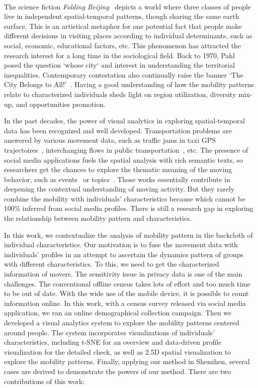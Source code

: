 \label{intro}
\\
The science fiction \textit{Folding Beijing}~\citep{hao2016_foldingbeijing} depicts a world where three classes of people live in independent spatial-temporal patterns, though sharing the same earth surface. This is an artistical metaphor for one potential fact that people make different decisions in visiting places according to individual determinants, such as social, economic, educational factors, etc. This phenomenon has attracted the research interest for a long time in the sociological field. Back to 1970, Pahl~\citep{pahl1975whose} posed the question `whose city` and interest in understanding the territorial inequalities. Contemporary contestation also continually raise the banner `The City Belongs to All!'~\citep{Mayer2017_whosecity}. Having a good understanding of how the mobility patterns relate to characterized individuals sheds light on region utilization, diversity mix-up, and opportunities promotion.

In the past decades, the power of visual analytics in exploring spatial-temporal data has been recognized and well developed. Transportation problems are answered by various movement data, such as traffic jams in taxi GPS trajectoires~\citep{wang2013visual}, interchanging flows in public transportation~\citep{zeng2013visualizing}, etc. The presence of social media applications fuels the spatial analysis with rich semantic texts, so researchers get the chances to explore the thematic meaning of the moving behavior, such as events~\citep{chen2017map} or topics~\citep{bosch2013scatterblogs2}. Those works essentially contribute in deepening the contextual understanding of moving activity. But they rarely combine the mobility with individuals' characteristics because which cannot be 100\% inferred from social media profiles. There is still a research gap in exploring the relationship between mobility pattern and characteristics.


In this work, we contextualize the analysis of mobility pattern in the backcloth of individual characteristics. Our motivation is to fuse the movement data with individuals' profiles in an attempt to ascertain the dynamics pattern of groups with different characteristics. To this, we need to get the characterized information of movers. The sensitivity issue in privacy data is one of the main challenges. The conventional offline census takes lots of effort and too much time to be out of date. With the wide use of the mobile device, it is possible to count information online. In this work, with a census survey released via social media application, we ran an online demographical collection campaign. Then we developed a visual analytics system to explore the mobility patterns centered around people. The system incorporates visualizations of individuals' characteristics, including t-SNE for an overview and data-driven profile visualization for the detailed check, as well as 2.5D spatial visualization to explore the mobility patterns. Finally, applying our method in Shenzhen, several cases are derived to demonstrate the powers of our method. There are two contributions of this work:

